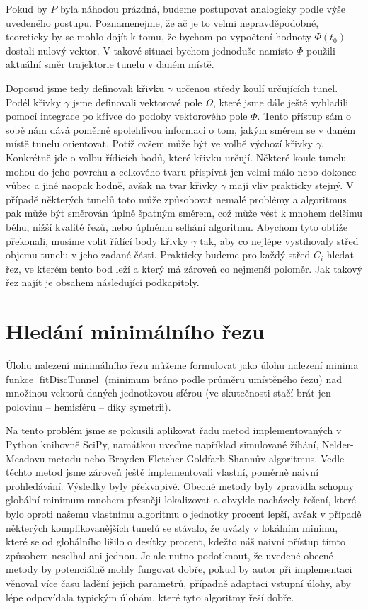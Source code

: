 Pokud by $ P $ byla náhodou prázdná, budeme postupovat
analogicky podle výše uvedeného postupu. Poznamenejme, že ač je to velmi
nepravděpodobné, teoreticky by se mohlo dojít k tomu, že bychom po vypočtení
hodnoty $ \Phi(t_0) $ dostali nulový vektor. V takové situaci bychom jednoduše
namísto $ \Phi $ použili aktuální směr trajektorie tunelu v daném místě.

Doposud jsme tedy definovali křivku $ \gamma $ určenou středy koulí určujících
tunel. Podél křivky $ \gamma $ jsme definovali vektorové pole $ \Omega $, které
jsme dále ještě vyhladili pomocí integrace po křivce do podoby vektorového
pole $ \Phi $. Tento přístup sám o sobě nám dává poměrně spolehlivou informaci
o tom, jakým směrem se v daném místě tunelu orientovat. Potíž ovšem
může být ve volbě výchozí křivky $ \gamma $. Konkrétně jde o volbu řídících bodů,
které křivku určují. Některé koule tunelu mohou do jeho povrchu a celkového
tvaru přispívat jen velmi málo nebo dokonce vůbec a jiné naopak hodně, avšak na tvar
křivky $ \gamma $ mají vliv prakticky stejný. V případě některých tunelů
toto může způsobovat nemalé problémy a algoritmus pak může být směrován úplně
špatným směrem, což může vést k mnohem delšímu běhu, nižší kvalitě řezů, nebo
úplnému selhání algoritmu. Abychom tyto obtíže překonali, musíme volit
řídící body křivky $ \gamma $ tak, aby co nejlépe vystihovaly střed objemu
tunelu v jeho zadané části. Prakticky budeme pro každý střed $ C_i $ hledat řez,
ve kterém tento bod leží a který má zároveň co nejmenší poloměr. Jak takový
řez najít je obsahem následující podkapitoly.






\section{Hledání minimálního řezu} \label{subsec:min_cut}
Úlohu nalezení minimálního řezu můžeme formulovat jako úlohu nalezení minima
funkce $ \operatorname{fitDiscTunnel} $ (minimum bráno podle průměru umístěného řezu)
nad množinou vektorů daných jednotkovou sférou (ve skutečnosti stačí brát
jen polovinu – hemisféru – díky symetrii).

Na tento problém jsme se pokusili aplikovat řadu metod implementovaných v Python
knihovně SciPy, namátkou uveďme například simulované žíhání, Nelder-Meadovu metodu
nebo Broyden-Fletcher-Goldfarb-Shannův algoritmus. Vedle těchto metod jsme zároveň
ještě implementovali vlastní, poměrně naivní prohledávání. Výsledky byly
překvapivé. Obecné metody byly zpravidla schopny globální minimum mnohem přesněji
lokalizovat a obvykle nacházely řešení, které bylo oproti našemu vlastnímu
algoritmu o jednotky procent lepší, avšak v případě některých komplikovanějších
tunelů se stávalo, že uvázly v lokálním minimu, které se od globálního lišilo
o desítky procent, kdežto náš naivní přístup tímto způsobem neselhal ani jednou.
Je ale nutno podotknout, že uvedené obecné metody by potenciálně mohly fungovat
dobře, pokud by autor při implementaci věnoval více času ladění jejich parametrů,
případně adaptaci vstupní úlohy, aby lépe odpovídala typickým úlohám, které tyto
algoritmy řeší dobře.

